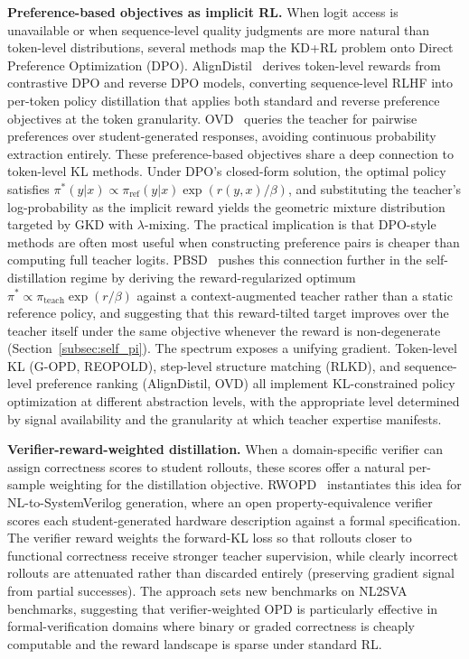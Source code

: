\documentclass{article} %
\begin{document}
\textbf{Preference-based objectives as implicit RL.} When logit access is unavailable or when sequence-level quality judgments are more natural than token-level distributions, several methods map the KD+RL problem onto Direct Preference Optimization (DPO). AlignDistil~\citep{2503.02832} derives token-level rewards from contrastive DPO and reverse DPO models, converting sequence-level RLHF into per-token policy distillation that applies both standard and reverse preference objectives at the token granularity. OVD~\citep{2601.21968} queries the teacher for pairwise preferences over student-generated responses, avoiding continuous probability extraction entirely. These preference-based objectives share a deep connection to token-level KL methods. Under DPO's closed-form solution, the optimal policy satisfies $\pi^*(y|x) \propto \pi_{\text{ref}}(y|x) \exp(r(y,x)/\beta)$, and substituting the teacher's log-probability as the implicit reward yields the geometric mixture distribution targeted by GKD with $\lambda$-mixing. The practical implication is that DPO-style methods are often most useful when constructing preference pairs is cheaper than computing full teacher logits. PBSD~\citep{2605.05040} pushes this connection further in the self-distillation regime by deriving the reward-regularized optimum $\pi^* \propto \pi_{\text{teach}} \exp(r/\beta)$ against a context-augmented teacher rather than a static reference policy, and suggesting that this reward-tilted target improves over the teacher itself under the same objective whenever the reward is non-degenerate (Section~\ref{subsec:self_pi}). The spectrum exposes a unifying gradient. Token-level KL (G-OPD, REOPOLD), step-level structure matching (RLKD), and sequence-level preference ranking (AlignDistil, OVD) all implement KL-constrained policy optimization at different abstraction levels, with the appropriate level determined by signal availability and the granularity at which teacher expertise manifests.

\textbf{Verifier-reward-weighted distillation.} When a domain-specific verifier can assign correctness scores to student rollouts, these scores offer a natural per-sample weighting for the distillation objective. RWOPD~\citep{2605.13501} instantiates this idea for NL-to-SystemVerilog generation, where an open property-equivalence verifier scores each student-generated hardware description against a formal specification. The verifier reward weights the forward-KL loss so that rollouts closer to functional correctness receive stronger teacher supervision, while clearly incorrect rollouts are attenuated rather than discarded entirely (preserving gradient signal from partial successes). The approach sets new benchmarks on NL2SVA benchmarks, suggesting that verifier-weighted OPD is particularly effective in formal-verification domains where binary or graded correctness is cheaply computable and the reward landscape is sparse under standard RL.
\end{document}
